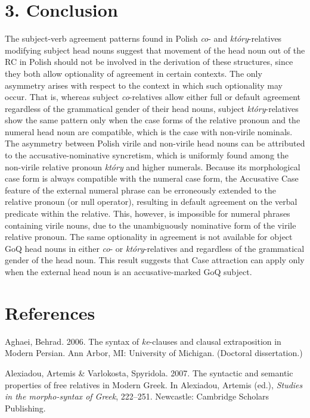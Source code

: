\documentclass[output=paper]{langsci/langscibook}
\begin{document}
\section{ 3. Conclusion}

\begin{styleListParagraph}
The subject-verb agreement patterns found in Polish \textit{co}{}- and \textit{który}{}-relatives modifying subject head nouns suggest that movement of the head noun out of the RC in Polish should not be involved in the derivation of these structures, since they both allow optionality of agreement in certain contexts. The only asymmetry arises with respect to the context in which such optionality may occur. That is, whereas subject \textit{co}{}-relatives allow either full or default agreement regardless of the grammatical gender of their head nouns, subject \textit{który}{}-relatives show the same pattern only when the case forms of the relative pronoun and the numeral head noun are compatible, which is the case with non-virile nominals. The asymmetry between Polish virile and non-virile head nouns can be attributed to the accusative-nominative syncretism, which is uniformly found among the non-virile relative pronoun \textit{który} and higher numerals. Because its morphological case form is always compatible with the numeral case form, the Accusative Case feature of the external numeral phrase can be erroneously extended to the relative pronoun (or null operator), resulting in default agreement on the verbal predicate within the relative. This, however, is impossible for numeral phrases containing virile nouns, due to the unambiguously nominative form of the virile relative pronoun. The same optionality in agreement is not available for object GoQ head nouns in either \textit{co}{}- or \textit{który}{}-relatives and regardless of the grammatical gender of the head noun. This result suggests that Case attraction can apply only when the external head noun is an accusative-marked GoQ subject.
\end{styleListParagraph}

\section{ References}

Aghaei, Behrad. 2006. The syntax of \textit{ke}{}-clauses and clausal extraposition in Modern Persian. Ann Arbor, MI: University of Michigan. (Doctoral dissertation.)

Alexiadou, Artemis \& Varlokosta, Spyridola. 2007. The syntactic and semantic properties of free relatives in Modern Greek. In Alexiadou, Artemis (ed.), \textit{Studies in the morpho-syntax of Greek}, 222–251. Newcastle: Cambridge Scholars Publishing.
\end{document}
